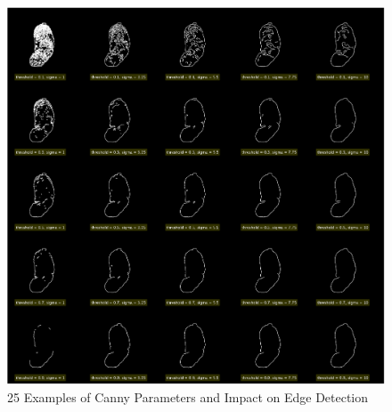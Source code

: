 \begin{figure}[h!]
    \centering
    \includegraphics[width = \textwidth]{fig/tiled_canny_test.png}
    \caption{25 Examples of Canny Parameters and Impact on Edge Detection}
    \label{fig:tiled_canny}
\end{figure}
